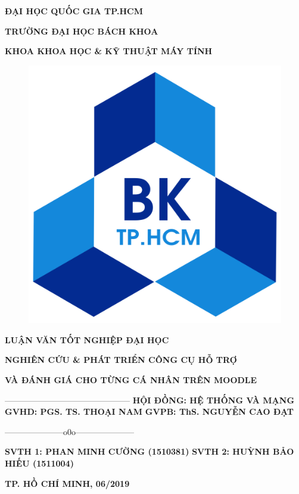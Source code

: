 
\begin{titlepage}
	\centerline{\fontsize{15}{15}\bf ĐẠI HỌC QUỐC GIA TP.HCM}
	\centerline{\fontsize{15}{15}\bf TRƯỜNG ĐẠI HỌC BÁCH KHOA}
	\centerline{\fontsize{15}{15}\bf KHOA KHOA HỌC \& KỸ THUẬT MÁY TÍNH}
	\begin{center}
		\begin{figure}[htp]
			\begin{center}
				\includegraphics[scale=0.1]{img/logo}
			\end{center}
		\end{figure}
	\end{center}
	\centerline{\fontsize{15}{15}\bf LUẬN VĂN TỐT NGHIỆP ĐẠI HỌC}
	\vspace*{2cm}
	\centerline{\Large\bf NGHIÊN CỨU \& PHÁT TRIỂN CÔNG CỤ HỖ TRỢ}
	\vspace*{0.5cm}
	\centerline{\Large\bf VÀ ĐÁNH GIÁ CHO TỪNG CÁ NHÂN TRÊN MOODLE}
	\vskip 0.5cm
	\hskip 4.9cm {———————————————}
	\vskip 1.5cm
	\hskip3cm{\fontsize{15}{15}\bf HỘI ĐỒNG: HỆ THỐNG VÀ MẠNG}
	\vskip 0.5cm
	\hskip3cm{\fontsize{15}{15}\bf GVHD: PGS. TS. THOẠI NAM}
	\vskip 0.5cm
	\hskip3cm{\fontsize{15}{15}\bf GVPB: ThS. NGUYỄN CAO ĐẠT}
	\vskip 0.5cm
	\centerline{———————o0o———————}
	\vskip 0.5cm
	\hskip3cm{\fontsize{15}{15}\bf SVTH 1: PHAN MINH CƯỜNG (1510381)}
	\vskip 0.5cm
	\hskip3cm{\fontsize{15}{15}\bf SVTH 2: HUỲNH BẢO HIẾU (1511004)}
	\vfill
	\centerline{\bf TP. HỒ CHÍ MINH, 06/2019}
\end{titlepage}